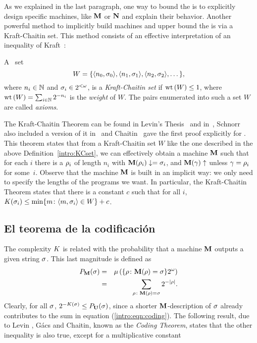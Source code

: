As we explained in the last paragraph, one way to bound the
\kolcomp is to explicitly design specific machines, like ${\bf M}$ or
${\bf N}$ and explain their behavior. Another powerful method to
implicitly build \pfree machines and upper bound the \pfree
\kolcomp is via a Kraft-Chaitin set. This method consists of an
effective interpretation of an inequality of Kraft~\cite{K49}:

\begin{definicion}\label{intro:KCset}
 A \ce\ set
$$
W=\{\langle n_0 , \sigma_0 \rangle, \langle n_1 , \sigma_1 \rangle,
\langle n_2 , \sigma_2 \rangle,\dots\},
$$
where $n_i\in\mathbb{N}$ and $\sigma_i\in 2^{<\omega}$, is a {\em Kraft-Chaitin
set} if ${\rm wt}\left(W\right)\leq 1$, where ${\rm wt}\left(W\right)=
\sum_{i\in\mathbb{N}} 2^{-n_i}$ is the {\em weight} of $W$. The pairs
enumerated into such a set $W$ are called {\em axioms}.
\end{definicion}

The Kraft-Chaitin Theorem can be found in Levin's
Thesis~\cite{L71} and in~\cite{levin1974laws}, Schnorr also included a
version of it in~\cite{S73} and Chaitin~\cite{chaitin1975theory} gave the first
proof explicitly for \pfree \kolcomp. This theorem states that
from a Kraft-Chaitin set $W$ like the one described in the above
Definition~\ref{intro:KCset}, we can effectively obtain a \pfree
machine ${\bf M}$ such that for each $i$ there is a $\rho_i$ of length
$n_i$ with ${\bf M}(\rho_i)\downarrow=\sigma_i$, and ${\bf M}(\gamma)\uparrow$
unless $\gamma=\rho_i$ for some~$i$. Observe that the machine ${\bf M}$
is built in an implicit way: we only need to specify the lengths
of the programs we want. In particular, the Kraft-Chaitin Theorem
states that there is a constant $c$ such that for all $i$,
$K(\sigma_i)\leq\min\{m\colon\langle m , \sigma_i \rangle\in W\}+c$.

\bigskip

\subsection{El teorema de la codificación}

The complexity $K$ is related with the probability that a \pfree
machine ${\bf M}$ outputs a given string $\sigma$. This last magnitude is
defined as 
\begin{eqnarray}
P_{{\bf M}}(\sigma)&=&\mu\left(\{\rho\colon{\bf M}(\rho)=\sigma\}2^{\omega}\right)\nonumber\\
&=&\sum_{\rho\colon{\bf M}(\rho)=\sigma}2^{-| \rho |}.\label{intro:eqn:coding}
\end{eqnarray}
Clearly, for all $\sigma$, $2^{-K(\sigma)}\leq P_{{\bf U}}(\sigma)$, since a
shorter ${\bf M}$-description of $\sigma$ already contributes to the sum
in equation (\ref{intro:eqn:coding}). The following result, due to
Levin \cite{levin1974laws}, G\'acs \cite{G74} and Chaitin, \cite{chaitin1975theory} known
as the {\em Coding Theorem}, states that the other inequality is
also true, except for a multiplicative constant


